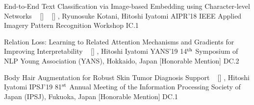 \begin{publications}
    \publication
    {End-to-End Text Classification via Image-based Embedding using Character-level Networks}
    {
    ~ [\href{https://doi.org/10.1109/AIPR.2018.8707407}{\small{\doiSymbol}}]
    ~ [\href{https://arxiv.org/abs/1810.03595}{\small{\arxivSymbol}}]
    }
    {\underline{}, Ryunosuke Kotani, Hitoshi Iyatomi}
    {AIPR'18} {IEEE Applied Imagery Pattern Recognition Workshop} {IC.1}

    \publication
    {Relation Loss: Learning to Related Attention Mechanisms and Gradients for Improving Interpretability}
    {
    ~ [\href{https://www.hosei.ac.jp/gs/NEWS/zaigaku/koganei/20190920/}{\small{\linkSymbol}}]
    }
    {\underline{}, Hitoshi Iyatomi}
    {YANS'19} {14$^{\textrm{\scriptsize th}}$ Symposium of NLP Young Association (YANS), Hokkaido, Japan [Honorable Mention]} {DC.2}

    \publication
    {Body Hair Augmentation for Robust Skin Tumor Diagnosis Support}
    {
    ~ [\href{https://www.hosei.ac.jp/gs/NEWS/topics/jusho/190411_4/}{\small{\linkSymbol}}]
    }
    {\underline{}, Hitoshi Iyatomi}
    {IPSJ'19} {81$^{\textrm{\scriptsize st}}$ Annual Meeting of the Information Processing Society of Japan (IPSJ), Fukuoka, Japan [Honorable Mention]} {DC.1}

\end{publications}
